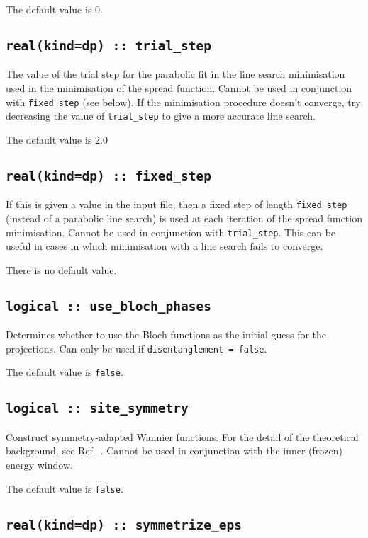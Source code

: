 The default value is 0.

\subsection[trial\_step]{\tt real(kind=dp) :: trial\_step}
The value of the trial step for the parabolic fit in the line
search minimisation used in the minimisation of the spread
function. Cannot be used in conjunction with \verb#fixed_step# (see
below). If the minimisation procedure doesn't converge, try decreasing
the value of \verb#trial_step# to give a more accurate line search.

The default value is 2.0

\subsection[fixed\_step]{\tt real(kind=dp) :: fixed\_step}
If this is given a value in the input file, then a fixed step of length
\verb#fixed_step# (instead of a parabolic
line search) is used at each iteration of the spread function
minimisation. Cannot be used in conjunction with
\verb#trial_step#. This can be useful in cases in which minimisation
with a line search fails to converge.

There is no default value.

\subsection[use\_bloch\_phases]{\tt logical :: use\_bloch\_phases}

Determines whether to use the Bloch functions as the
initial guess for the projections. Can only be used if
\verb#disentanglement = false#.

The default value is \verb#false#.


\subsection[site\_symmetry]{\tt logical :: site\_symmetry}

Construct symmetry-adapted Wannier functions.
For the detail of the theoretical background, see Ref.~\cite{sakuma-prb13}.
Cannot be used in conjunction with the inner (frozen) energy window.

The default value is \verb#false#.

\subsection[symmetrize\_eps]{\tt real(kind=dp) :: symmetrize\_eps}

